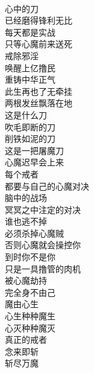 \begin{poem}
    \begin{multicols}{3}
        \centering~\\
        心中的刀 \\ 已经磨得锋利无比 \\ 每天都是实战 \\ 只等心魔前来送死 \\ 戒除邪淫 \\ 唤醒上亿撸民 \\ 重铸中华正气 \\ 此生再也了无牵挂 \\ 两根发丝飘落在地 \\ 这是什么刀 \\ 吹毛即断的刀 \\ 削铁如泥的刀 \\ 这是一把屠魔刀 \\ 心魔迟早会上来 \\ 每个戒者 \\ 都要与自己的心魔对决 \\ 脑中的战场 \\ 冥冥之中注定的对决 \\ 谁也逃不掉 \\ 必须杀掉心魔贼 \\ 否则心魔就会操控你 \\ 到时你不是你 \\ 只是一具撸管的肉机 \\ 被心魔劫持 \\ 完全身不由己 \\ 魔由心生 \\ 心生种种魔生 \\ 心灭种种魔灭 \\ 真正的戒者 \\ 念来即斩 \\ 斩尽万魔
    \end{multicols}
\end{poem}

